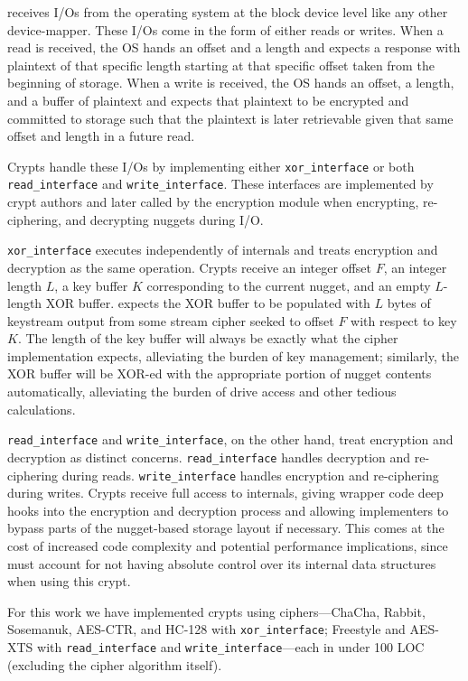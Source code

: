 \sys receives I/Os from the operating system at the block device level like any
other device-mapper. These I/Os come in the form of either reads or writes. When
a read is received, the OS hands \sys an offset and a length and expects a
response with plaintext of that specific length starting at that specific offset
taken from the beginning of storage. When a write is received, the OS hands \sys
an offset, a length, and a buffer of plaintext and expects that plaintext to be
encrypted and committed to storage such that the plaintext is later retrievable
given that same offset and length in a future read.

Crypts handle these I/Os by implementing either \texttt{xor\_interface} or both
\texttt{read\_interface} and \texttt{write\_interface}. These interfaces are
implemented by crypt authors and later called by the encryption module when
encrypting, re-ciphering, and decrypting nuggets during I/O.


\texttt{xor\_interface} executes independently of \sys internals and treats
encryption and decryption as the same operation. Crypts receive an integer
offset $F$, an integer length $L$, a key buffer $K$ corresponding to the current
nugget, and an empty $L$-length XOR buffer. \sys expects the XOR buffer to be
populated with $L$ bytes of keystream output from some stream cipher seeked to
offset $F$ with respect to key $K$. The length of the key buffer will always be
exactly what the cipher implementation expects, alleviating the burden of key
management; similarly, the XOR buffer will be XOR-ed with the appropriate
portion of nugget contents automatically, alleviating the burden of drive access
and other tedious calculations.


\texttt{read\_interface} and \texttt{write\_interface}, on the other hand, treat
encryption and decryption as distinct concerns. \texttt{read\_interface} handles
decryption and re-ciphering during reads. \texttt{write\_interface} handles
encryption and re-ciphering during writes. Crypts receive full access to \sys
internals, giving wrapper code deep hooks into the encryption and decryption
process and allowing implementers to bypass parts of the nugget-based storage
layout if necessary. This comes at the cost of increased code complexity and
potential performance implications, since \sys must account for not having
absolute control over its internal data structures when using this crypt.

For this work we have implemented \numConfigs crypts using \numCiphers
ciphers---ChaCha, Rabbit, Sosemanuk, AES-CTR, and HC-128 with
\texttt{xor\_interface}; Freestyle and AES-XTS with \texttt{read\_interface} and
\texttt{write\_interface}---each in under 100 LOC (excluding the cipher
algorithm itself).
